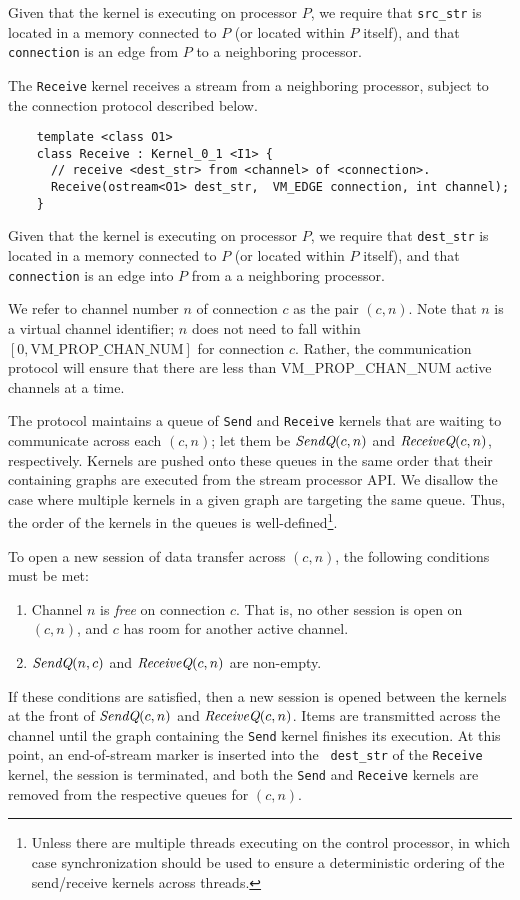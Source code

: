 Given that the kernel is executing on processor $P$, we require that
{\tt src\_str} is located in a memory connected to $P$ (or located
within $P$ itself), and that {\tt connection} is an edge from $P$ to a
neighboring processor.

 The {\tt Receive} kernel receives a stream from a
neighboring processor, subject to the connection protocol described
below.  
{\small
\begin{verbatim}
    template <class O1>
    class Receive : Kernel_0_1 <I1> {
      // receive <dest_str> from <channel> of <connection>.
      Receive(ostream<O1> dest_str,  VM_EDGE connection, int channel);
    }  
\end{verbatim}}

Given that the kernel is executing on processor $P$, we require that
{\tt dest\_str} is located in a memory connected to $P$ (or located
within $P$ itself), and that {\tt connection} is an edge into $P$ from
a a neighboring processor.

 We refer to channel number $n$ of
connection $c$ as the pair $(c, n)$.  Note that $n$ is a virtual
channel identifier; $n$ does not need to fall within $[0,
\mbox{VM\_PROP\_CHAN\_NUM}]$ for connection $c$.  Rather, the
communication protocol will ensure that there are less than
VM\_PROP\_CHAN\_NUM active channels at a time.

The protocol maintains a queue of {\tt Send} and {\tt Receive} kernels
that are waiting to communicate across each $(c, n)$; let them be
$\mbox{\it SendQ}(c, n)$ and $\mbox{\it ReceiveQ}(c, n)$, respectively.  Kernels
are pushed onto these queues in the same order that their containing
graphs are executed from the stream processor API.  We disallow the
case where multiple kernels in a given graph are targeting the same
queue.  Thus, the order of the kernels in the queues is
well-defined\footnote{Unless there are multiple threads executing on
the control processor, in which case synchronization should be used to
ensure a deterministic ordering of the send/receive kernels across
threads.}.

To open a new session of data transfer across $(c, n)$, the following
conditions must be met:
\begin{enumerate}

\item Channel $n$ is {\it free} on connection $c$.  That is, no other
session is open on $(c, n)$, and $c$ has room for another active
channel.

\item $\mbox{\it SendQ}(n,c)$ and $\mbox{\it ReceiveQ}(c, n)$ are non-empty.

\end{enumerate}
If these conditions are satisfied, then a new session is opened
between the kernels at the front of $\mbox{\it SendQ}(c, n)$ and
$\mbox{\it ReceiveQ}(c, n)$.  Items are transmitted across the channel until
the graph containing the {\tt Send} kernel finishes its execution.  At
this point, an end-of-stream marker is inserted into the {\tt
dest\_str} of the {\tt Receive} kernel, the session is terminated, and
both the {\tt Send} and {\tt Receive} kernels are removed from the
respective queues for $(c, n)$.


